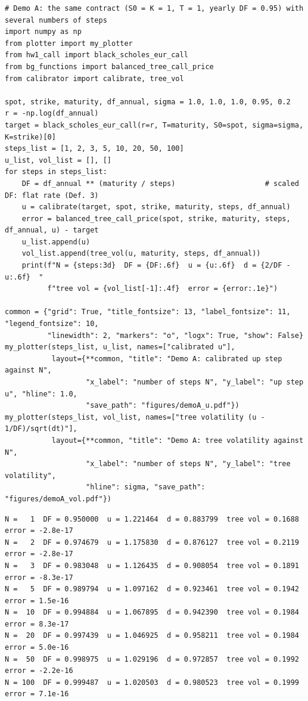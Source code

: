 \documentclass[11pt,a4paper]{article}
\begin{document}
\par\smallskip\noindent\begin{minipage}{\linewidth}\begin{lstlisting}[style=pysmall,title={Demo A (\texttt{demo\_A.py})}]
# Demo A: the same contract (S0 = K = 1, T = 1, yearly DF = 0.95) with several numbers of steps
import numpy as np
from plotter import my_plotter
from hw1_call import black_scholes_eur_call
from bg_functions import balanced_tree_call_price
from calibrator import calibrate, tree_vol

spot, strike, maturity, df_annual, sigma = 1.0, 1.0, 1.0, 0.95, 0.2
r = -np.log(df_annual)
target = black_scholes_eur_call(r=r, T=maturity, S0=spot, sigma=sigma, K=strike)[0]
steps_list = [1, 2, 3, 5, 10, 20, 50, 100]
u_list, vol_list = [], []
for steps in steps_list:
    DF = df_annual ** (maturity / steps)                     # scaled DF: flat rate (Def. 3)
    u = calibrate(target, spot, strike, maturity, steps, df_annual)
    error = balanced_tree_call_price(spot, strike, maturity, steps, df_annual, u) - target
    u_list.append(u)
    vol_list.append(tree_vol(u, maturity, steps, df_annual))
    print(f"N = {steps:3d}  DF = {DF:.6f}  u = {u:.6f}  d = {2/DF - u:.6f}  "
          f"tree vol = {vol_list[-1]:.4f}  error = {error:.1e}")

common = {"grid": True, "title_fontsize": 13, "label_fontsize": 11, "legend_fontsize": 10,
          "linewidth": 2, "markers": "o", "logx": True, "show": False}
my_plotter(steps_list, u_list, names=["calibrated u"],
           layout={**common, "title": "Demo A: calibrated up step against N",
                   "x_label": "number of steps N", "y_label": "up step u", "hline": 1.0,
                   "save_path": "figures/demoA_u.pdf"})
my_plotter(steps_list, vol_list, names=["tree volatility (u - 1/DF)/sqrt(dt)"],
           layout={**common, "title": "Demo A: tree volatility against N",
                   "x_label": "number of steps N", "y_label": "tree volatility",
                   "hline": sigma, "save_path": "figures/demoA_vol.pdf"})
\end{lstlisting}
\begin{lstlisting}[style=out,title={output (\texttt{demo\_A.out})}]
N =   1  DF = 0.950000  u = 1.221464  d = 0.883799  tree vol = 0.1688  error = -2.8e-17
N =   2  DF = 0.974679  u = 1.175830  d = 0.876127  tree vol = 0.2119  error = -2.8e-17
N =   3  DF = 0.983048  u = 1.126435  d = 0.908054  tree vol = 0.1891  error = -8.3e-17
N =   5  DF = 0.989794  u = 1.097162  d = 0.923461  tree vol = 0.1942  error = 1.5e-16
N =  10  DF = 0.994884  u = 1.067895  d = 0.942390  tree vol = 0.1984  error = 8.3e-17
N =  20  DF = 0.997439  u = 1.046925  d = 0.958211  tree vol = 0.1984  error = 5.0e-16
N =  50  DF = 0.998975  u = 1.029196  d = 0.972857  tree vol = 0.1992  error = -2.2e-16
N = 100  DF = 0.999487  u = 1.020503  d = 0.980523  tree vol = 0.1999  error = 7.1e-16
\end{lstlisting}\end{minipage}\par\smallskip
\end{document}
